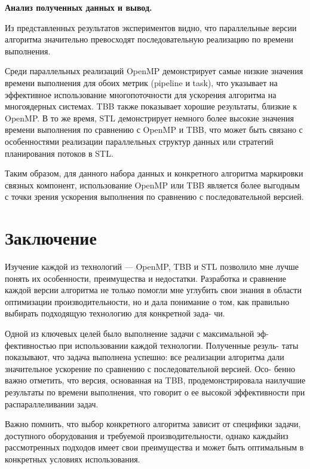 \documentclass[a4paper, 14pt]{article}
\begin{document}
	\textbf{Анализ полученных данных и вывод.}

	\noindent 
        Из представленных результатов экспериментов видно, что параллельные версии алгоритма значительно превосходят последовательную реализацию по времени выполнения.

        Среди параллельных реализаций OpenMP демонстрирует самые низкие значения времени выполнения для обоих метрик (pipeline и task), что указывает на эффективное использование многопоточности для ускорения алгоритма на многоядерных системах. TBB также показывает хорошие результаты, близкие к OpenMP. В то же время, STL демонстрирует немного более высокие значения времени выполнения по сравнению с OpenMP и TBB, что может быть связано с особенностями реализации параллельных структур данных или стратегий планирования потоков в STL.
        
        Таким образом, для данного набора данных и конкретного алгоритма маркировки связных компонент, использование OpenMP или TBB является более выгодным с точки зрения ускорения выполнения по сравнению с последовательной версией.

	\newpage
	\section*{\centering Заключение}

	   Изучение каждой из технологий — OpenMP, TBB и STL позволило мне
        лучше понять их особенности, преимущества и недостатки. Разработка и
        сравнение каждой версии алгоритма не только помогли мне углубить свои
        знания в области оптимизации производительности, но и дала понимание о
        том, как правильно выбирать подходящую технологию для конкретной зада-
        чи.
        
            Одной из ключевых целей было выполнение задачи с максимальной эф-
        фективностью при использовании каждой технологии. Полученные резуль-
        таты показывают, что задача выполнена успешно: все реализации алгоритма
        дали значительное ускорение по сравнению с последовательной версией. Осо-
        бенно важно отметить, что версия, основанная на TBB, продемонстрировала
        наилучшие результаты по времени выполнения, что говорит о ее высокой
        эффективности при распараллеливании задач.

        Важно помнить, что выбор конкретного алгоритма зависит от специфики задачи, доступного оборудования и требуемой производительности, однако каждыйиз рассмотренных подходов имеет свои преимущества и может быть оптимальным в конкретных условиях использования.
\end{document}
